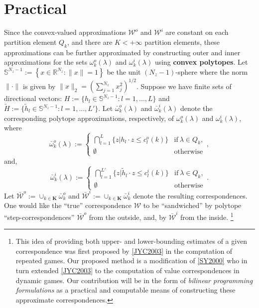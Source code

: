 \documentclass[a4paper,10pt,english]{sphinxmanual}
\begin{document}
\section{Practical}
\label{payoff_concept:practical}
Since the convex-valued approximations
\(\mathcal{W}^o\) and \(\mathcal{W}^i\) are constant on each partition
element \(Q_k\), and there are \(K < +\infty\) partition elements, these
approximations can be further approximated by constructing outer and inner
approximations for the sets \(\omega^o_k (\lambda)\) and
\(\omega^i_k (\lambda)\) using \textbf{convex polytopes}.
Let \(\mathbb{S}^{N_z-1} := \left\{x \in \mathbb{R}^{N_z} : \| x \| = 1 \right\}\) be the unit \((N_z - 1)\)-sphere where the norm \(\| \cdot \|\) is given by \(\| x \|_{2} = \left(\sum_{j=1}^{N_z} x_{j}^2\right)^{1/2}\). Suppose we have finite sets of directional vectors: \(H := \{ h_l \in
\mathbb{S}^{N_z-1} : l = 1,...,L \}\) and \(\tilde{H} := \{ \tilde{h}_l \in
\mathbb{S}^{N_z-1} : l = 1,...,L' \}\).
Let
\(\bar{\omega}^o_k (\lambda)\) and \(\bar{\omega}^i_k (\lambda)\)
denote the corresponding polytope approximations, respectively, of \(\omega^o_k (\lambda)\) and
\(\omega^i_k (\lambda)\), where
     \begin{equation*}
        \bar{\omega}^o_k (\lambda) :=
        \begin{cases}
         \bigcap_{l=1}^{L}\{ z | h_l \cdot z \leq c_{l}^{o}(k) \} & \text{if} \ \lambda \in Q_k,\\
        \emptyset & \text{otherwise}
        \end{cases},
    \end{equation*}
and,
     \begin{equation*}
        \bar{\omega}^i_k (\lambda) :=
        \begin{cases}
         \bigcap_{l=1}^{L'}\{ z | \tilde{h}_l \cdot z \leq c_{l}^{i}(k) \} & \text{if} \ \lambda \in Q_k,\\
        \emptyset & \text{otherwise}
        \end{cases}.
    \end{equation*}
Let \(\bar{\mathcal{W}}^o := \cup_{k \in \mathbf{K}}\bar{\omega}^o_k\)
and \(\bar{\mathcal{W}}^i :=  \cup_{k \in \mathbf{K}}\bar{\omega}^i_k\) denote the resulting correspondences. One would like the ``true'' correspondence \(\mathcal{W}\) to be ``sandwiched'' by polytope ``step-correspondences'' \(\bar{\mathcal{W}}^o\) from the outside, and, by  \(\bar{\mathcal{W}}^i\) from the inside. \footnote{
This idea of providing both upper- and lower-bounding estimates of a given
correspondence was first proposed by {\hyperref[payoff_compute:jyc2003]{{[}JYC2003{]}}} in the computation of
repeated games. Our proposed method is a modification of {\hyperref[payoff_compute:sy2000]{{[}SY2000{]}}}
who in turn extended {\hyperref[payoff_compute:jyc2003]{{[}JYC2003{]}}} to the computation of value correspondences
in dynamic games. Our
contribution will be in the form of \emph{bilinear programming formulations} as
a practical and computable means of constructing these approximate correspondences.
}
\end{document}
